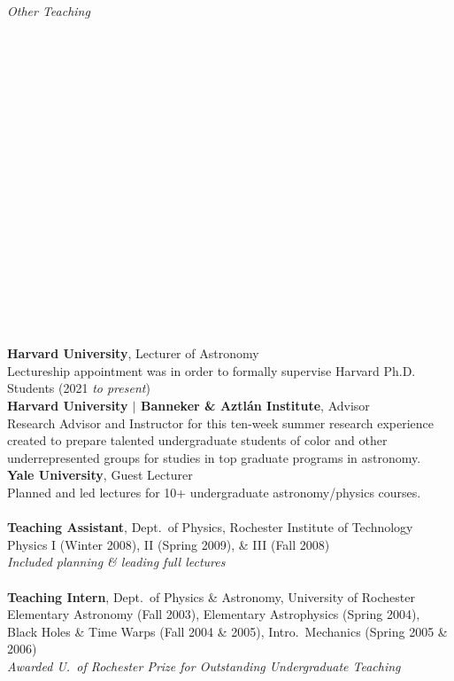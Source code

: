 \documentclass[11pt]{article}
\begin{document}
\hspace{2.5mm} \parbox{1.5in}{\textit{Other Teaching \\\\\\\\\\\\\\\\\\\\\\\\\\\\\\\\\\\\\\}} \parbox{5.15in}{



\textbf{Harvard University}, Lecturer of Astronomy\\
Lectureship appointment was in order to formally supervise Harvard Ph.D. Students (2021 \textit{to present}) \\

\textbf{Harvard University $|$ Banneker \& Aztl\'{a}n Institute}, Advisor\\
Research Advisor and Instructor for this ten-week summer research
experience created to prepare talented undergraduate students of color and other
underrepresented groups for studies in top graduate programs in astronomy. \\

\textbf{Yale University}, Guest Lecturer\\
Planned and led lectures for 10+ undergraduate astronomy/physics courses. \\
\\
\textbf{Teaching Assistant}, Dept.~of Physics, Rochester Institute of Technology \\
Physics I (Winter 2008), II (Spring 2009), \& III (Fall 2008) \\
\textit{Included planning \& leading full lectures}\\
\\
\textbf{Teaching Intern}, Dept.~of Physics \& Astronomy, University of Rochester \\
Elementary Astronomy (Fall 2003), Elementary Astrophysics (Spring 2004),
Black Holes \& Time Warps (Fall 2004 \& 2005), Intro.~Mechanics (Spring 2005 \& 2006) \\ \textit{Awarded U.~of Rochester Prize for Outstanding Undergraduate Teaching}}
\end{document}
